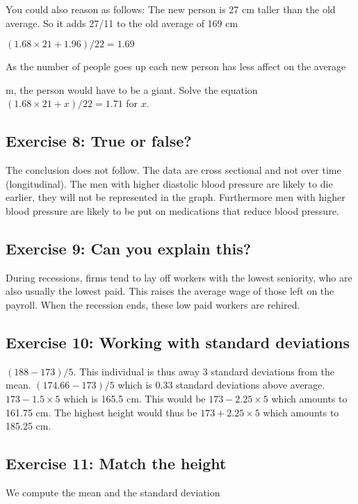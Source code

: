 \documentclass[letterpaper,10pt,english]{jupyterBook}
\begin{document}
\sphinxAtStartPar
You could also reason as follows: The new person is 27 cm taller than the old average. So it adds 27/11 to the old average of 169 cm

\sphinxAtStartPar
\((1.68 \times 21 + 1.96)/22 = 1.69\)

\sphinxAtStartPar
As the number of people goes up each new person has less affect on the average

 m, the person would have to be a giant. Solve the equation \((1.68 \times 21 + x)/22 = 1.71\) for \(x\).


\subsection{Exercise 8: True or false?}
\label{\detokenize{exercises_unit_2:exercise-8-true-or-false}}
\sphinxAtStartPar
The conclusion does not follow. The data are cross sectional and not over time (longitudinal). The men with higher diastolic blood pressure are likely to die earlier, they will not be represented in the graph. Furthermore men with higher blood pressure are likely to be put on medications that reduce blood pressure.


\subsection{Exercise 9: Can you explain this?}
\label{\detokenize{exercises_unit_2:exercise-9-can-you-explain-this}}
\sphinxAtStartPar
During recessions, firms tend to lay off workers with the lowest seniority, who are also usually the lowest paid. This raises the average wage of those left on the payroll. When the recession ends, these low paid workers are rehired.


\subsection{Exercise 10: Working with standard deviations}
\label{\detokenize{exercises_unit_2:exercise-10-working-with-standard-deviations}}
\sphinxAtStartPar
\((188-173)/5\). This individual is thus away 3 standard deviations from the mean. \((174.66 -173)/5\) which is 0.33 standard deviations above average. \(173 - 1.5 \times 5\) which is 165.5 cm. This would be \(173 - 2.25 \times 5\) which amounts to 161.75 cm. The highest height would thus be \(173 + 2.25 \times 5\) which amounts to 185.25 cm.


\subsection{Exercise 11: Match the height}
\label{\detokenize{exercises_unit_2:exercise-11-match-the-height}}
\sphinxAtStartPar
We compute the mean and the standard deviation
\end{document}
